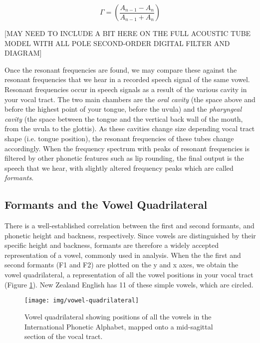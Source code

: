 \begin{equation}
    \label{reflection}
    \Gamma = \left( \frac{A_{n-1} - A_n}{A_{n-1} + A_n} \right)
\end{equation}

[MAY NEED TO INCLUDE A BIT HERE ON THE FULL ACOUSTIC TUBE MODEL WITH ALL POLE SECOND-ORDER DIGITAL FILTER AND DIAGRAM]

Once the resonant frequencies are found, we  may compare these against the resonant frequencies that we hear in a recorded speech signal of the same vowel. Resonant frequencies occur in speech signals as a result of the various cavity in your vocal tract. The two main chambers are the \textit{oral cavity} (the space above and before the highest point of your tongue, before the uvula) and the \textit{pharyngeal cavity} (the space between the tongue and the vertical back wall of the mouth, from the uvula to the glottis). As these cavities change size depending vocal tract shape (i.e. tongue position), the resonant frequencies of these tubes change accordingly. When the frequency spectrum with peaks of resonant frequencies is filtered by other phonetic features such as lip rounding, the final output is the speech that we hear, with slightly altered frequency peaks which are called \textit{formants}.

\subsection{Formants and the Vowel Quadrilateral}

There is a well-established correlation between the first and second formants, and phonetic height and backness, respectively. Since vowels are distinguished by their specific height and backness, formants are therefore a widely accepted representation of a vowel, commonly used in analysis. When the the first and second formants (F1 and F2) are plotted on the y and x axes, we obtain the vowel quadrilateral, a representation of all the vowel positions in your vocal tract (Figure \ref{fig:vowelquad}). New Zealand English has 11 of these simple vowels, which are circled.

\begin{figure}[H]
\centering
\texttt{[image: img/vowel-quadrilateral]}
\caption{Vowel quadrilateral showing positions of all the vowels in the International Phonetic Alphabet, mapped onto a mid-sagittal section of the vocal tract.}
\label{fig:vowelquad}
\end{figure}

